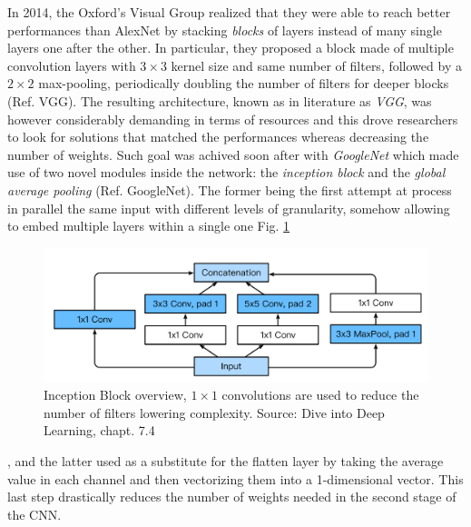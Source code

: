 \documentclass[LaM,binding=0.6cm]{./packages/sapthesis/sapthesis}
\begin{document}
        In 2014, the Oxford's Visual Group realized that they were able to reach better performances than AlexNet by stacking \textit{blocks} of layers instead of many 
        single layers one after the other. In particular, they proposed a block made of multiple convolution layers with $ 3 \times 3 $ kernel size and same 
        number of filters, followed by a $ 2 \times 2 $ max-pooling, periodically doubling the number of filters for deeper blocks (Ref. VGG). The resulting 
        architecture, known as in literature as \textit{VGG}, was however considerably demanding in terms of resources and this drove researchers to look 
        for solutions that matched the performances whereas decreasing the number of weights. Such goal was achived soon after with \textit{GoogleNet}
        which made use of two novel modules inside the network: the \textit{inception block} and the \textit{global average pooling} (Ref. GoogleNet). The former 
        being the first attempt at process in parallel the same input with different levels of granularity, somehow allowing to embed multiple layers within a single
        one Fig. \ref{fig:inception}
        \begin{figure}[h!]
            \centering
            \includegraphics[scale=0.25]{inception}
            \caption{Inception Block overview, $1\times 1$ convolutions are used to reduce the number of filters lowering complexity. Source: Dive into Deep Learning, chapt. 7.4}
            \label{fig:inception}
        \end{figure}
        , and the latter used as a substitute for the flatten layer by taking the average value in each channel and then vectorizing them into a 1-dimensional vector. 
        This last step drastically reduces the number of weights needed in the second stage of the CNN. 
        
\end{document}
